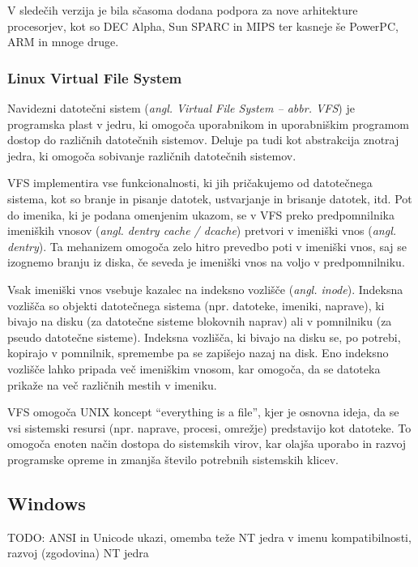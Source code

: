 \documentclass[a4paper,12pt,openright]{book}
\begin{document}
V sledečih verzija je bila sčasoma dodana podpora za nove arhitekture procesorjev, kot so DEC Alpha, Sun SPARC in MIPS ter kasneje še PowerPC, ARM in mnoge druge.
\cite{Silberschatz_Galvin_Gagne_2018}

\subsubsection{Linux Virtual File System}

Navidezni datotečni sistem (\textit{angl. Virtual File System -- abbr. VFS}) je programska plast v jedru, ki omogoča uporabnikom in uporabniškim programom dostop do različnih datotečnih sistemov.
Deluje pa tudi kot abstrakcija znotraj jedra, ki omogoča sobivanje različnih datotečnih sistemov.

VFS implementira vse funkcionalnosti, ki jih pričakujemo od datotečnega sistema, kot so branje in pisanje datotek, ustvarjanje in brisanje datotek, itd.
Pot do imenika, ki je podana omenjenim ukazom, se v VFS preko predpomnilnika imeniških vnosov (\textit{angl. dentry cache / dcache}) pretvori v imeniški vnos (\textit{angl. dentry}).
Ta mehanizem omogoča zelo hitro prevedbo poti v imeniški vnos, saj se izognemo branju iz diska, če seveda je imeniški vnos na voljo v predpomnilniku.

Vsak imeniški vnos vsebuje kazalec na indeksno vozlišče (\textit{angl. inode}). Indeksna vozlišča so objekti datotečnega sistema (npr. datoteke, imeniki, naprave), ki bivajo na disku (za datotečne sisteme blokovnih naprav) ali v pomnilniku (za pseudo datotečne sisteme).
Indeksna vozlišča, ki bivajo na disku se, po potrebi, kopirajo v pomnilnik, spremembe pa se zapišejo nazaj na disk.
Eno indeksno vozlišče lahko pripada več imeniškim vnosom, kar omogoča, da se datoteka prikaže na več različnih mestih v imeniku.
\cite{Linux_kernel_docs_LVFS}

VFS omogoča UNIX koncept ``everything is a file'', kjer je osnovna ideja, da se vsi sistemski resursi (npr. naprave, procesi, omrežje) predstavijo kot datoteke.
To omogoča enoten način dostopa do sistemskih virov, kar olajša uporabo in razvoj programske opreme in zmanjša število potrebnih sistemskih klicev.

\subsection{Windows}

TODO: ANSI in Unicode ukazi, omemba teže NT jedra v imenu kompatibilnosti, razvoj (zgodovina) NT jedra
\end{document}
